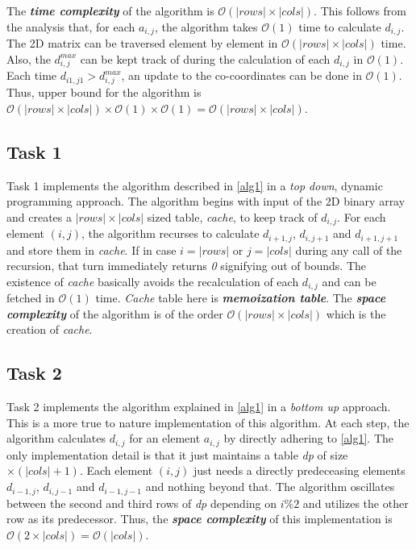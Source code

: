 \documentclass[10pt,a4paper]{article}
\begin{document}
The \textbf{\textit{time complexity}} of the algorithm is $ \mathcal{O}(|rows| \times |cols|) $.
This follows from the analysis that, for each $ a_{i, j} $, the algorithm takes $ \mathcal{O}(1) $ time to calculate $ d_{i, j} $.
The 2D matrix can be traversed element by element in $ \mathcal{O}(|rows| \times |cols|) $ time.
Also, the $ d^{max}_{i, j} $ can be kept track of during the calculation of each $ d_{i, j} $ in $ \mathcal{O}(1) $.
Each time $ d_{i1, j1} > d^{max}_{i, j} $, an update to the co-coordinates can be done in $ \mathcal{O}(1) $.
Thus, upper bound for the algorithm is $ \mathcal{O}(|rows| \times |cols|) \times \mathcal{O}(1) \times \mathcal{O}(1) = \mathcal{O}(|rows| \times |cols|) $.

\subsection*{Task 1}
Task 1 implements the algorithm described in \ref{alg1} in a \textit{top down}, dynamic programming approach.
The algorithm begins with input of the 2D binary array and creates a $ |rows| \times |cols| $ sized table, \textit{cache}, to keep track of $ d_{i,j} $.
For each element $ (i, j) $, the algorithm recurses to calculate $ d_{i+1, j} $, $ d_{i, j+1} $ and $ d_{i+1, j+1} $ and store them in \textit{cache}.
If in case $ i = |rows| $ or $ j = |cols| $ during any call of the recursion, that turn immediately returns \textit{0} signifying out of bounds.
The existence of \textit{cache} basically avoids the recalculation of each $ d_{i, j} $ and can be fetched in $ \mathcal{O}(1) $ time.
\textit{Cache} table here is \textbf{\textit{memoization table}}.
The \textbf{\textit{space complexity}} of the algorithm is of the order $ \mathcal{O}(|rows| \times |cols|) $ which is the creation of \textit{cache}.

\subsection*{Task 2}
Task 2 implements the algorithm explained in \ref{alg1} in a \textit{bottom up} approach.
This is a more true to nature implementation of this algorithm.
At each step, the algorithm calculates $ d_{i, j} $ for an element $ a_{i, j} $ by directly adhering to \ref{alg1}.
The only implementation detail is that it just maintains a table \textit{dp} of size $ \times (|cols|+1) $.
Each element $ (i, j) $ just needs a directly predeceasing elements $ d_{i-1, j} $, $ d_{i, j-1} $ and $ d_{i-1, j-1} $ and nothing beyond that.
The algorithm oscillates between the second and third rows of \textit{dp} depending on $ i\%2 $ and utilizes the other row as its predecessor.
Thus, the \textbf{\textit{space complexity}} of this implementation is $ \mathcal{O}(2 \times |cols|) = \mathcal{O}(|cols|) $.
\end{document}
